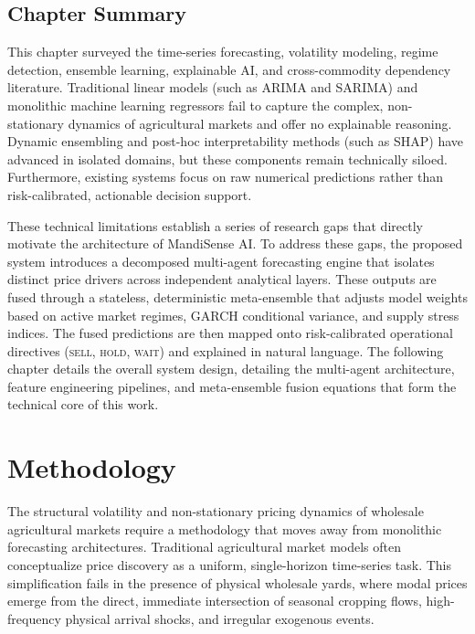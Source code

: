 \documentclass[12pt,a4paper]{report}
\theoremstyle{definition}
\theoremstyle{remark}
\begin{document}
\section{Chapter Summary}

This chapter surveyed the time-series forecasting, volatility modeling, regime detection, ensemble learning, explainable AI, and cross-commodity dependency literature. Traditional linear models (such as ARIMA and SARIMA) and monolithic machine learning regressors fail to capture the complex, non-stationary dynamics of agricultural markets and offer no explainable reasoning. Dynamic ensembling and post-hoc interpretability methods (such as SHAP) have advanced in isolated domains, but these components remain technically siloed. Furthermore, existing systems focus on raw numerical predictions rather than risk-calibrated, actionable decision support.

These technical limitations establish a series of research gaps that directly motivate the architecture of MandiSense AI. To address these gaps, the proposed system introduces a decomposed multi-agent forecasting engine that isolates distinct price drivers across independent analytical layers. These outputs are fused through a stateless, deterministic meta-ensemble that adjusts model weights based on active market regimes, GARCH conditional variance, and supply stress indices. The fused predictions are then mapped onto risk-calibrated operational directives (\textsc{sell}, \textsc{hold}, \textsc{wait}) and explained in natural language. The following chapter details the overall system design, detailing the multi-agent architecture, feature engineering pipelines, and meta-ensemble fusion equations that form the technical core of this work.

\chapter{Methodology}

The structural volatility and non-stationary pricing dynamics of wholesale agricultural markets require a methodology that moves away from monolithic forecasting architectures. Traditional agricultural market models often conceptualize price discovery as a uniform, single-horizon time-series task. This simplification fails in the presence of physical wholesale yards, where modal prices emerge from the direct, immediate intersection of seasonal cropping flows, high-frequency physical arrival shocks, and irregular exogenous events. 
\end{document}
